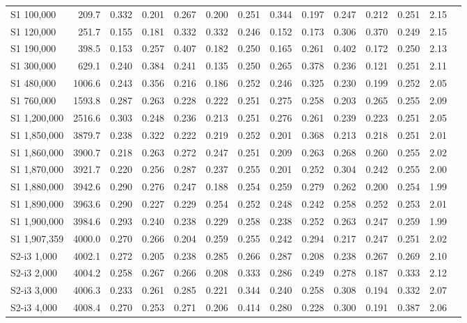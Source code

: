 \begin{longtable}{lrcccccccccccc}
S1 100,000 & 209.7 & 0.332 & 0.201 & 0.267 & 0.200 & 0.251 & 0.344 & 0.197 & 0.247 & 0.212 & 0.251 & 2.15 \\
S1 120,000 & 251.7 & 0.155 & 0.181 & 0.332 & 0.332 & 0.246 & 0.152 & 0.173 & 0.306 & 0.370 & 0.249 & 2.15 \\
S1 190,000 & 398.5 & 0.153 & 0.257 & 0.407 & 0.182 & 0.250 & 0.165 & 0.261 & 0.402 & 0.172 & 0.250 & 2.13 \\
S1 300,000 & 629.1 & 0.240 & 0.384 & 0.241 & 0.135 & 0.250 & 0.265 & 0.378 & 0.236 & 0.121 & 0.251 & 2.11 \\
S1 480,000 & 1006.6 & 0.243 & 0.356 & 0.216 & 0.186 & 0.252 & 0.246 & 0.325 & 0.230 & 0.199 & 0.252 & 2.05 \\
S1 760,000 & 1593.8 & 0.287 & 0.263 & 0.228 & 0.222 & 0.251 & 0.275 & 0.258 & 0.203 & 0.265 & 0.255 & 2.09 \\
S1 1,200,000 & 2516.6 & 0.303 & 0.248 & 0.236 & 0.213 & 0.251 & 0.276 & 0.261 & 0.239 & 0.223 & 0.251 & 2.05 \\
S1 1,850,000 & 3879.7 & 0.238 & 0.322 & 0.222 & 0.219 & 0.252 & 0.201 & 0.368 & 0.213 & 0.218 & 0.251 & 2.01 \\
S1 1,860,000 & 3900.7 & 0.218 & 0.263 & 0.272 & 0.247 & 0.251 & 0.209 & 0.263 & 0.268 & 0.260 & 0.255 & 2.02 \\
S1 1,870,000 & 3921.7 & 0.220 & 0.256 & 0.287 & 0.237 & 0.255 & 0.201 & 0.252 & 0.304 & 0.242 & 0.255 & 2.00 \\
S1 1,880,000 & 3942.6 & 0.290 & 0.276 & 0.247 & 0.188 & 0.254 & 0.259 & 0.279 & 0.262 & 0.200 & 0.254 & 1.99 \\
S1 1,890,000 & 3963.6 & 0.290 & 0.227 & 0.229 & 0.254 & 0.252 & 0.248 & 0.242 & 0.258 & 0.252 & 0.253 & 2.01 \\
S1 1,900,000 & 3984.6 & 0.293 & 0.240 & 0.238 & 0.229 & 0.258 & 0.238 & 0.252 & 0.263 & 0.247 & 0.259 & 1.99 \\
S1 1,907,359 & 4000.0 & 0.270 & 0.266 & 0.204 & 0.259 & 0.255 & 0.242 & 0.294 & 0.217 & 0.247 & 0.251 & 2.02 \\
S2-i3 1,000 & 4002.1 & 0.272 & 0.205 & 0.238 & 0.285 & 0.266 & 0.287 & 0.208 & 0.238 & 0.267 & 0.269 & 2.10 \\
S2-i3 2,000 & 4004.2 & 0.258 & 0.267 & 0.266 & 0.208 & 0.333 & 0.286 & 0.249 & 0.278 & 0.187 & 0.333 & 2.12 \\
S2-i3 3,000 & 4006.3 & 0.233 & 0.261 & 0.285 & 0.221 & 0.344 & 0.240 & 0.258 & 0.308 & 0.194 & 0.332 & 2.07 \\
S2-i3 4,000 & 4008.4 & 0.270 & 0.253 & 0.271 & 0.206 & 0.414 & 0.280 & 0.228 & 0.300 & 0.191 & 0.387 & 2.06 \\

\end{longtable}
